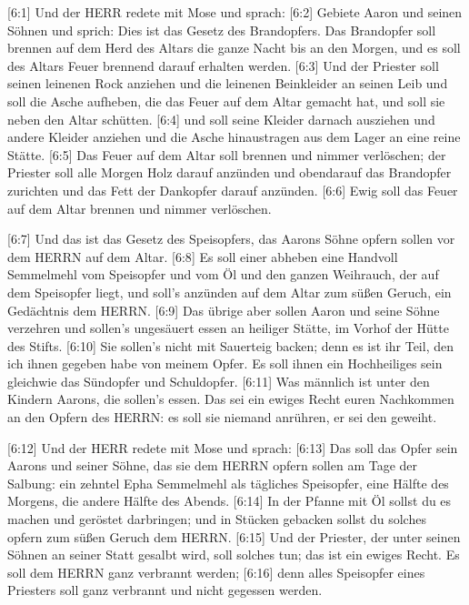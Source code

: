  {[}6:1{]} Und der HERR redete mit Mose und sprach:
 {[}6:2{]} Gebiete Aaron und seinen Söhnen und sprich: Dies
ist das Gesetz des Brandopfers. Das Brandopfer soll brennen auf dem Herd
des Altars die ganze Nacht bis an den Morgen, und es soll des Altars
Feuer brennend darauf erhalten werden.  {[}6:3{]} Und der
Priester soll seinen leinenen Rock anziehen und die leinenen Beinkleider
an seinen Leib und soll die Asche aufheben, die das Feuer auf dem Altar
gemacht hat, und soll sie neben den Altar schütten. 
{[}6:4{]} und soll seine Kleider darnach ausziehen und andere Kleider
anziehen und die Asche hinaustragen aus dem Lager an eine reine Stätte.
 {[}6:5{]} Das Feuer auf dem Altar soll brennen und nimmer
verlöschen; der Priester soll alle Morgen Holz darauf anzünden und
obendarauf das Brandopfer zurichten und das Fett der Dankopfer darauf
anzünden.  {[}6:6{]} Ewig soll das Feuer auf dem Altar
brennen und nimmer verlöschen.

 {[}6:7{]} Und das ist das Gesetz des Speisopfers, das
Aarons Söhne opfern sollen vor dem HERRN auf dem Altar. 
{[}6:8{]} Es soll einer abheben eine Handvoll Semmelmehl vom Speisopfer
und vom Öl und den ganzen Weihrauch, der auf dem Speisopfer liegt, und
soll's anzünden auf dem Altar zum süßen Geruch, ein Gedächtnis dem
HERRN.  {[}6:9{]} Das übrige aber sollen Aaron und seine
Söhne verzehren und sollen's ungesäuert essen an heiliger Stätte, im
Vorhof der Hütte des Stifts.  {[}6:10{]} Sie sollen's nicht
mit Sauerteig backen; denn es ist ihr Teil, den ich ihnen gegeben habe
von meinem Opfer. Es soll ihnen ein Hochheiliges sein gleichwie das
Sündopfer und Schuldopfer.  {[}6:11{]} Was männlich ist
unter den Kindern Aarons, die sollen's essen. Das sei ein ewiges Recht
euren Nachkommen an den Opfern des HERRN: es soll sie niemand anrühren,
er sei den geweiht.

 {[}6:12{]} Und der HERR redete mit Mose und sprach:
 {[}6:13{]} Das soll das Opfer sein Aarons und seiner
Söhne, das sie dem HERRN opfern sollen am Tage der Salbung: ein zehntel
Epha Semmelmehl als tägliches Speisopfer, eine Hälfte des Morgens, die
andere Hälfte des Abends.  {[}6:14{]} In der Pfanne mit Öl
sollst du es machen und geröstet darbringen; und in Stücken gebacken
sollst du solches opfern zum süßen Geruch dem HERRN. 
{[}6:15{]} Und der Priester, der unter seinen Söhnen an seiner Statt
gesalbt wird, soll solches tun; das ist ein ewiges Recht. Es soll dem
HERRN ganz verbrannt werden;  {[}6:16{]} denn alles
Speisopfer eines Priesters soll ganz verbrannt und nicht gegessen
werden.

